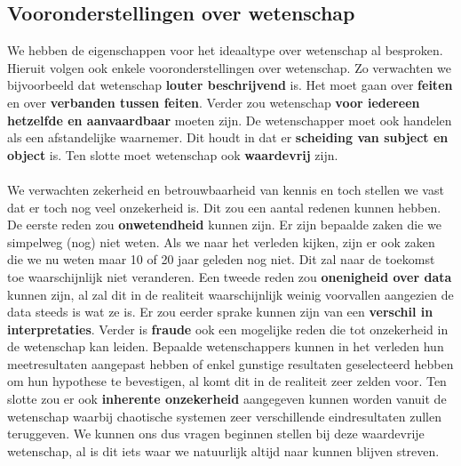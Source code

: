 \documentclass[../summary.tex]{subfiles}
\begin{document}
	\subsection{Vooronderstellingen over wetenschap}
	
	We hebben de eigenschappen voor het ideaaltype over wetenschap al besproken. Hieruit volgen ook enkele vooronderstellingen over wetenschap. Zo verwachten we bijvoorbeeld dat wetenschap \textbf{louter beschrijvend} is. Het moet gaan over \textbf{feiten} en over \textbf{verbanden tussen feiten}. Verder zou wetenschap \textbf{voor iedereen hetzelfde en aanvaardbaar} moeten zijn. De wetenschapper moet ook handelen als een afstandelijke waarnemer. Dit houdt in dat er \textbf{scheiding van subject en object} is. Ten slotte moet wetenschap ook \textbf{waardevrij} zijn.
	\\\\
	We verwachten zekerheid en betrouwbaarheid van kennis en toch stellen we vast dat er toch nog veel onzekerheid is. Dit zou een aantal redenen kunnen hebben. De eerste reden zou \textbf{onwetendheid} kunnen zijn. Er zijn bepaalde zaken die we simpelweg (nog) niet weten. Als we naar het verleden kijken, zijn er ook zaken die we nu weten maar 10 of 20 jaar geleden nog niet. Dit zal naar de toekomst toe waarschijnlijk niet veranderen. Een tweede reden zou \textbf{onenigheid over data} kunnen zijn, al zal dit in de realiteit waarschijnlijk weinig voorvallen aangezien de data steeds is wat ze is. Er zou eerder sprake kunnen zijn van een \textbf{verschil in interpretaties}. Verder is \textbf{fraude} ook een mogelijke reden die tot onzekerheid in de wetenschap kan leiden. Bepaalde wetenschappers kunnen in het verleden hun meetresultaten aangepast hebben of enkel gunstige resultaten geselecteerd hebben om hun hypothese te bevestigen, al komt dit in de realiteit zeer zelden voor. Ten slotte zou er ook \textbf{inherente onzekerheid} aangegeven kunnen worden vanuit de wetenschap waarbij chaotische systemen zeer verschillende eindresultaten zullen teruggeven. We kunnen ons dus vragen beginnen stellen bij deze waardevrije wetenschap, al is dit iets waar we natuurlijk altijd naar kunnen blijven streven.
	
\end{document}
